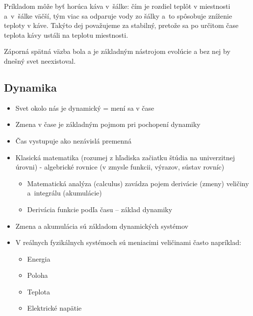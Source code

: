 \documentclass[a4paper, 10pt, ]{article}
\begin{document}
Príkladom môže byť horúca káva v~šálke: čím je rozdiel teplôt v miestnosti a~v~šálke väčší, tým viac sa odparuje vody zo šálky a~to spôsobuje zníženie teploty v káve. Takýto dej považujeme za stabilný, pretože sa po určitom čase teplota kávy ustáli na teplotu miestnosti.

\medskip

\noindent
Záporná spätná väzba bola a je základným nástrojom evolúcie a bez nej by dnešný svet neexistoval.





\subsection{Dynamika}

\begin{itemize}[leftmargin=0pt, labelsep=3mm, itemsep=0pt]
    \item Svet okolo nás je dynamický = mení sa v čase
    \item Zmena v čase je základným pojmom pri pochopení dynamiky
    \item Čas vystupuje ako nezávislá premenná
    \item Klasická matematika (rozumej z hľadiska začiatku štúdia na univerzitnej úrovni) - algebrické rovnice (v zmysle funkcii, výrazov, sústav rovníc)
    \begin{itemize}
        \item Matematická analýza (calculus) zavádza pojem derivácie (zmeny) veličiny a~integrálu (akumulácie)
        \item Derivácia funkcie podľa času – základ dynamiky
    \end{itemize}
    \item Zmena a akumulácia sú základom dynamických systémov
    \item V reálnych fyzikálnych systémoch sú meniacimi veličinami často napríklad:
    \begin{itemize}
        \item Energia
        \item Poloha
        \item Teplota
        \item Elektrické napätie
    \end{itemize}
\end{itemize}



\smallskip
\end{document}
